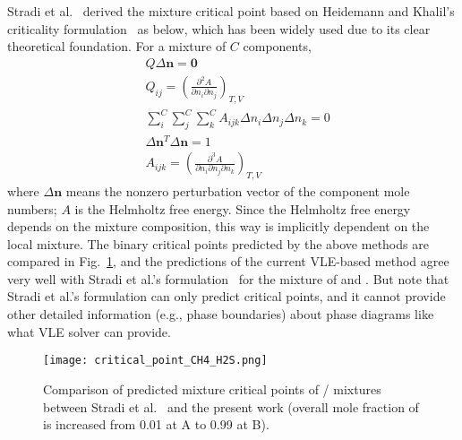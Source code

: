     Stradi et al.~\cite{stradi2001reliable} derived the mixture critical point based on Heidemann and Khalil's criticality formulation~\cite{heidemann1980calculation} as below, which has been widely used due to its clear theoretical foundation. For a mixture of $C$ components,
    \begin{align}
         & Q\Delta \mathbf n=\mathbf0                                                                          \\
         & Q_{ij}=\left( \frac{\partial^2A}{\partial n_i \partial n_j}\right)_{T,V}                            \\
         & \sum_i^{C}\sum_{j}^{C}\sum_{k}^{C}A_{ijk}\Delta n_i\Delta n_{j}\Delta n_{k}=0                       \\
         & \Delta \mathbf n^{T}\Delta \mathbf n=1                                                              \\
         & A_{ijk}=\left( \frac{\partial^3A}{\partial n_i \partial n_j\partial n_k}\right)_{T,V} \label{eq:19}
    \end{align}
    where $\Delta \mathbf n$ means the nonzero perturbation vector of the component mole numbers; $A$ is the Helmholtz free energy. Since the Helmholtz free energy depends on the mixture composition, this way is implicitly dependent on the local mixture. The binary critical points predicted by the above methods are compared in Fig.~\ref{v2}, and the predictions of the current VLE-based method agree very well with Stradi et al.'s formulation~\cite{stradi2001reliable} for the mixture of  and . But note that Stradi et al.'s formulation can only predict critical points, and it cannot provide other detailed information (e.g., phase boundaries) about phase diagrams like what VLE solver can provide.


    \begin{figure}[htbp]
        \begin{center}
            \texttt{[image: critical\_point\_CH4\_H2S.png]}
        \end{center}
        \caption{Comparison of predicted mixture critical points of / mixtures between Stradi et al.~\cite{stradi2001reliable} and the present work (overall mole fraction of  is increased from 0.01 at A to 0.99 at B).
        }
        \label{v2}
    \end{figure}

